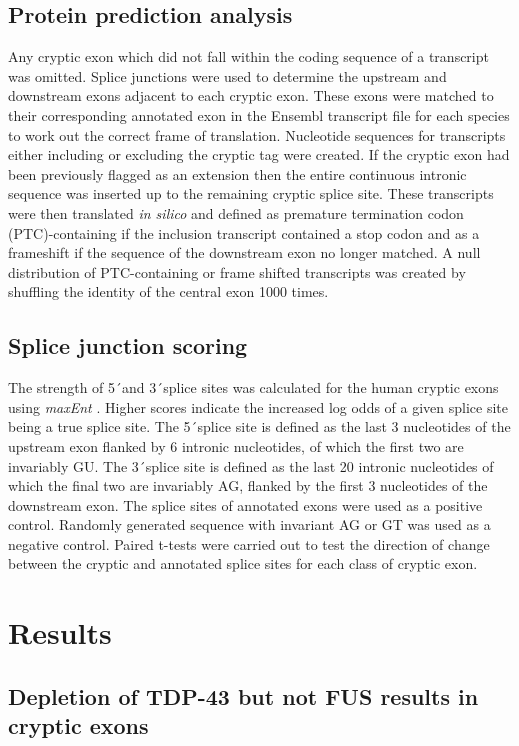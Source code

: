 \subsection{Protein prediction analysis}
Any cryptic exon which did not fall within the coding sequence of a transcript was omitted. Splice junctions were used to determine the upstream and downstream exons adjacent to each cryptic exon. These exons were matched to their corresponding annotated exon in the Ensembl transcript file for each species to work out the correct frame of translation. Nucleotide sequences for transcripts either including or excluding the cryptic tag were created. If the cryptic exon had been previously flagged as an extension then the entire continuous intronic sequence was inserted up to the remaining cryptic splice site. These transcripts were then translated \textit{in silico} and defined as premature termination codon (PTC)-containing if the inclusion transcript contained a stop codon and as a frameshift if the sequence of the downstream exon no longer matched. A null distribution of PTC-containing or frame shifted transcripts was created by shuffling the identity of the central exon 1000 times. 

\subsection{Splice junction scoring }
The strength of 5\'\ and 3\'\ splice sites was calculated for the human cryptic exons using \emph{maxEnt} \citep{Yeo2004-pz}. Higher scores indicate the increased log odds of a given splice site being a true splice site. The 5\'\ splice site is defined as the last 3 nucleotides of the upstream exon flanked by 6 intronic nucleotides, of which the first two are invariably GU. The 3\'\ splice site is defined as the last 20 intronic nucleotides of which the final two are invariably AG, flanked by the first 3 nucleotides of the downstream exon. The splice sites of annotated exons were used as a positive control. Randomly generated sequence with invariant AG or GT was used as a negative control. Paired t-tests were carried out to test the direction of change between the cryptic and annotated splice sites for each class of cryptic exon.


\section{Results}
\subsection{Depletion of TDP-43 but not FUS results in cryptic exons}

